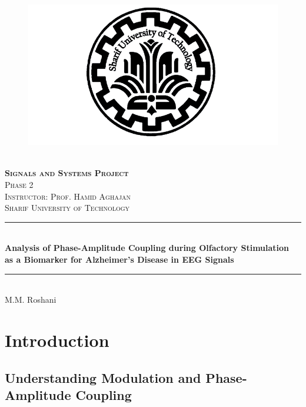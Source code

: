 \documentclass[hidelinks,12pt]{article}
\author{M.M. Roshani}
\begin{document}
	\begin{titlepage}
		\begin{center}
			\begin{figure}
				\vspace{-1.0cm}
				\centering
				\includegraphics[scale=0.35]{SUT_logo}
			\end{figure}
			\mbox{}\\[2.0cm]
			\textsc{\Huge \textbf{Signals and Systems Project}}\\[1.0cm]
			\textsc{\LARGE Phase 2}\\[1.5cm]
			\textsc{\LARGE Instructor: Prof. Hamid Aghajan}\\[1cm]
			\textsc{\LARGE Sharif University of Technology}\\[1.0cm]
			\rule{\linewidth}{0.5mm} \\
			{\large \bf {\selectfont Analysis of Phase-Amplitude Coupling during Olfactory Stimulation \\ \medskip as a Biomarker for Alzheimer's Disease in EEG Signals}}\\[0.2cm]
			\rule{\linewidth}{0.5mm} \\
			\vfill
			{\Large M.M. Roshani}
		\end{center}
	\end{titlepage}
	
	\tableofcontents
	\newpage
	
	
	\section{Introduction}
	\subsection{Understanding Modulation and Phase-Amplitude Coupling}
	
\end{document}
